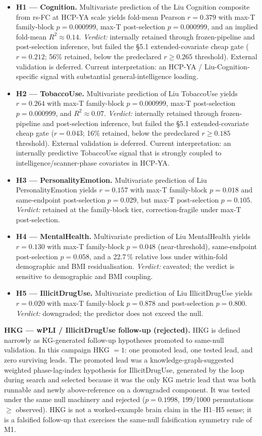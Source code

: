 \documentclass[11pt,letterpaper]{report}
\begin{document}
\begin{itemize}[leftmargin=1.6em,itemsep=0.2em]
\item \textbf{H1 --- Cognition.} Multivariate prediction of the Liu Cognition composite from rs-FC at HCP-YA scale yields fold-mean Pearson $r = 0.379$ with max-T family-block $p = 0.000999$, max-T post-selection $p = 0.000999$, and an implied fold-mean $R^{2} \approx 0.14$. \emph{Verdict:} internally retained through frozen-pipeline and post-selection inference, but failed the \S5.1 extended-covariate cheap gate ($r = 0.212$; 56\% retained, below the predeclared $r \ge 0.265$ threshold). External validation is deferred. Current interpretation: an HCP-YA / Liu-Cognition-specific signal with substantial general-intelligence loading.
\item \textbf{H2 --- TobaccoUse.} Multivariate prediction of Liu TobaccoUse yields $r = 0.264$ with max-T family-block $p = 0.000999$, max-T post-selection $p = 0.000999$, and $R^{2} \approx 0.07$. \emph{Verdict:} internally retained through frozen-pipeline and post-selection inference, but failed the \S5.1 extended-covariate cheap gate ($r = 0.043$; 16\% retained, below the predeclared $r \ge 0.185$ threshold). External validation is deferred. Current interpretation: an internally predictive TobaccoUse signal that is strongly coupled to intelligence/scanner-phase covariates in HCP-YA.
\item \textbf{H3 --- PersonalityEmotion.} Multivariate prediction of Liu PersonalityEmotion yields $r = 0.157$ with max-T family-block $p = 0.018$ and same-endpoint post-selection $p = 0.029$, but max-T post-selection $p = 0.105$. \emph{Verdict:} retained at the family-block tier, correction-fragile under max-T post-selection.
\item \textbf{H4 --- MentalHealth.} Multivariate prediction of Liu MentalHealth yields $r = 0.130$ with max-T family-block $p = 0.048$ (near-threshold), same-endpoint post-selection $p = 0.058$, and a 22.7\,\% relative loss under within-fold demographic and BMI residualisation. \emph{Verdict:} caveated; the verdict is sensitive to demographic and BMI coupling.
\item \textbf{H5 --- IllicitDrugUse.} Multivariate prediction of Liu IllicitDrugUse yields $r = 0.020$ with max-T family-block $p = 0.878$ and post-selection $p = 0.800$. \emph{Verdict:} downgraded; the predictor does not exceed the null.
\end{itemize}

\textbf{HKG --- wPLI / IllicitDrugUse follow-up (rejected).} HKG is defined narrowly as KG-generated follow-up hypotheses promoted to same-null validation. In this campaign HKG $= 1$: one promoted lead, one tested lead, and zero surviving leads. The promoted lead was a knowledge-graph-suggested weighted phase-lag-index hypothesis for IllicitDrugUse, generated by the loop during search and selected because it was the only KG metric lead that was both runnable and newly above-reference on a downgraded component. It was tested under the same null machinery and rejected ($p = 0.1998$, 199/1000 permutations $\ge$ observed). HKG is not a worked-example brain claim in the H1--H5 sense; it is a falsified follow-up that exercises the same-null falsification symmetry rule of M1.
\end{document}
